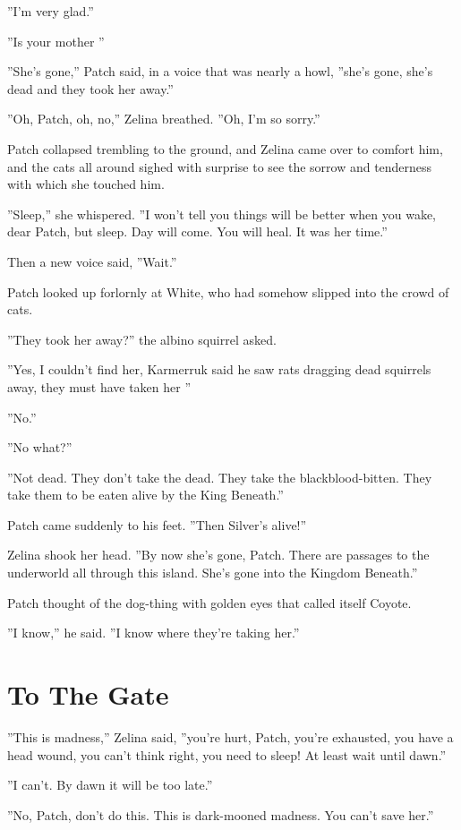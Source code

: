 \documentclass[12pt]{book}
\begin{document}
''I'm very glad.''

''Is your mother %
''

''She's gone,'' Patch said, in a voice that was nearly a howl, ''she's gone, she's dead and they took her away.''

''Oh, Patch, oh, no,'' Zelina breathed. ''Oh, I'm so sorry.''

Patch collapsed trembling to the ground, and Zelina came over to comfort him, and the cats all around sighed with surprise to see the sorrow and tenderness with which she touched him.

''Sleep,'' she whispered. ''I won't tell you things will be better when you wake, dear Patch, but sleep. Day will come. You will heal. It was her time.''

Then a new voice said, ''Wait.''

Patch looked up forlornly at White, who had somehow slipped into the crowd of cats. 

''They took her away?'' the albino squirrel asked.

''Yes, I couldn't find her, Karmerruk said he saw rats dragging dead squirrels away, they must have taken her %
''

''No.''

''No what?''

''Not dead. They don't take the dead. They take the blackblood-bitten. They take them to be eaten alive by the King Beneath.''

Patch came suddenly to his feet. ''Then Silver's alive!''

Zelina shook her head. ''By now she's gone, Patch. There are passages to the underworld all through this island. She's gone into the Kingdom Beneath.''

Patch thought of the dog-thing with golden eyes that called itself Coyote.

''I know,'' he said. ''I know where they're taking her.''


\section{To The Gate}

''This is madness,'' Zelina said, ''you're hurt, Patch, you're exhausted, you have a head wound, you can't think right, you need to sleep! At least wait until dawn.''

''I can't. By dawn it will be too late.''

''No, Patch, don't do this. This is dark-mooned madness. You can't save her.''
\end{document}
